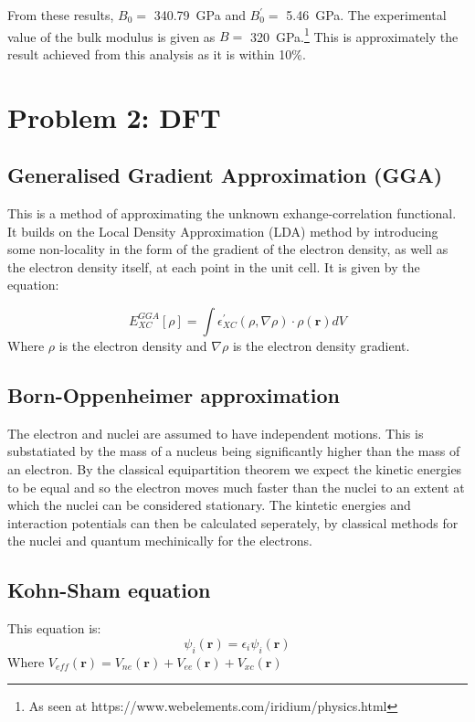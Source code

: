 \documentclass[12pt]{article}
\begin{document}
	\bigskip
	
	\noindent From these results, $B_0 = $ \SI{340.79}{\GPa} and $B_0^{\prime} = $ \SI{5.46}{\GPa}. The experimental value of the bulk modulus is given as $B = $ \SI{320}{\GPa}.\footnote{As seen at https://www.webelements.com/iridium/physics.html} This is approximately the result achieved from this analysis as it is within 10\%.
	
	
	\section{Problem 2: DFT}
		\subsection*{Generalised Gradient Approximation (GGA)}
		This is a method of approximating the unknown exhange-correlation functional. It builds on the Local Density Approximation (LDA) method by introducing some non-locality in the form of the gradient of the electron density, as well as the electron density itself, at each point in the unit cell. It is given by the equation:
		
		\begin{equation}
		E_{XC}^{GGA}[\rho] = \int \epsilon_{XC}^{\prime}(\rho, \nabla\rho)\cdot\rho(\textbf{r}) dV
		\end{equation}
		Where $\rho$ is the electron density and $\nabla\rho$ is the electron density gradient.

		\subsection*{Born-Oppenheimer approximation}
		The electron and nuclei are assumed to have independent motions. This is substatiated by the mass of a nucleus being significantly higher than the mass of an electron. By the classical equipartition theorem we expect the kinetic energies to be equal and so the electron moves much faster than the nuclei to an extent at which the nuclei can be considered stationary. The kintetic energies and interaction potentials can then be calculated seperately, by classical methods for the nuclei and quantum mechinically for the electrons.

		\subsection*{Kohn-Sham equation}
		This equation is:
		\begin{equation}
		[\hat{T} + V_{eff}]\psi_i(\textbf{r}) = \epsilon_i \psi_i(\textbf{r})
		\end{equation}
		Where $V_{eff}(\textbf{r}) = V_{ne}(\textbf{r}) + V_{ee}(\textbf{r}) + V_{xc}(\textbf{r})$
		
\end{document}
